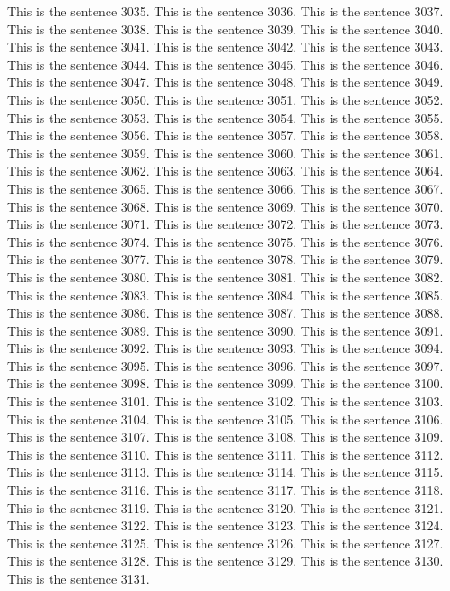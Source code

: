 \documentclass{article}
\begin{document}
This is the sentence 3035.
This is the sentence 3036.
This is the sentence 3037.
This is the sentence 3038.
This is the sentence 3039.
This is the sentence 3040.
This is the sentence 3041.
This is the sentence 3042.
This is the sentence 3043.
This is the sentence 3044.
This is the sentence 3045.
This is the sentence 3046.
This is the sentence 3047.
This is the sentence 3048.
This is the sentence 3049.
This is the sentence 3050.
This is the sentence 3051.
This is the sentence 3052.
This is the sentence 3053.
This is the sentence 3054.
This is the sentence 3055.
This is the sentence 3056.
This is the sentence 3057.
This is the sentence 3058.
This is the sentence 3059.
This is the sentence 3060.
This is the sentence 3061.
This is the sentence 3062.
This is the sentence 3063.
This is the sentence 3064.
This is the sentence 3065.
This is the sentence 3066.
This is the sentence 3067.
This is the sentence 3068.
This is the sentence 3069.
This is the sentence 3070.
This is the sentence 3071.
This is the sentence 3072.
This is the sentence 3073.
This is the sentence 3074.
This is the sentence 3075.
This is the sentence 3076.
This is the sentence 3077.
This is the sentence 3078.
This is the sentence 3079.
This is the sentence 3080.
This is the sentence 3081.
This is the sentence 3082.
This is the sentence 3083.
This is the sentence 3084.
This is the sentence 3085.
This is the sentence 3086.
This is the sentence 3087.
This is the sentence 3088.
This is the sentence 3089.
This is the sentence 3090.
This is the sentence 3091.
This is the sentence 3092.
This is the sentence 3093.
This is the sentence 3094.
This is the sentence 3095.
This is the sentence 3096.
This is the sentence 3097.
This is the sentence 3098.
This is the sentence 3099.
This is the sentence 3100.
This is the sentence 3101.
This is the sentence 3102.
This is the sentence 3103.
This is the sentence 3104.
This is the sentence 3105.
This is the sentence 3106.
This is the sentence 3107.
This is the sentence 3108.
This is the sentence 3109.
This is the sentence 3110.
This is the sentence 3111.
This is the sentence 3112.
This is the sentence 3113.
This is the sentence 3114.
This is the sentence 3115.
This is the sentence 3116.
This is the sentence 3117.
This is the sentence 3118.
This is the sentence 3119.
This is the sentence 3120.
This is the sentence 3121.
This is the sentence 3122.
This is the sentence 3123.
This is the sentence 3124.
This is the sentence 3125.
This is the sentence 3126.
This is the sentence 3127.
This is the sentence 3128.
This is the sentence 3129.
This is the sentence 3130.
This is the sentence 3131.
\end{document}
